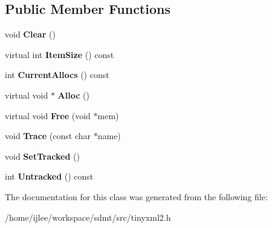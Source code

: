\subsection*{Public Member Functions}
\begin{DoxyCompactItemize}
\item 
\mbox{\label{classtinyxml2_1_1_mem_pool_t_a22d595caa0e9d23aa080f49ca6475fdd}} 
void {\bfseries Clear} ()
\item 
\mbox{\label{classtinyxml2_1_1_mem_pool_t_a54e4d9b343459ef1731314a99877ff35}} 
virtual int {\bfseries Item\+Size} () const
\item 
\mbox{\label{classtinyxml2_1_1_mem_pool_t_a445a6c80151ba6268b24ec62a7c84d74}} 
int {\bfseries Current\+Allocs} () const
\item 
\mbox{\label{classtinyxml2_1_1_mem_pool_t_a810fd2b0caf56b8b688e55f2768f96c7}} 
virtual void $\ast$ {\bfseries Alloc} ()
\item 
\mbox{\label{classtinyxml2_1_1_mem_pool_t_a408ce0918e9d3d5e5e1cc4896944875f}} 
virtual void {\bfseries Free} (void $\ast$mem)
\item 
\mbox{\label{classtinyxml2_1_1_mem_pool_t_a47eefbd934ef70d973ea41d41ab5f239}} 
void {\bfseries Trace} (const char $\ast$name)
\item 
\mbox{\label{classtinyxml2_1_1_mem_pool_t_aee3c611215ae08cce41a940bf2763027}} 
void {\bfseries Set\+Tracked} ()
\item 
\mbox{\label{classtinyxml2_1_1_mem_pool_t_a3bcdc302ae15d2810e11192321a8f5f1}} 
int {\bfseries Untracked} () const
\end{DoxyCompactItemize}


The documentation for this class was generated from the following file\+:\begin{DoxyCompactItemize}
\item 
/home/ijlee/workspace/sdmt/src/tinyxml2.\+h\end{DoxyCompactItemize}
